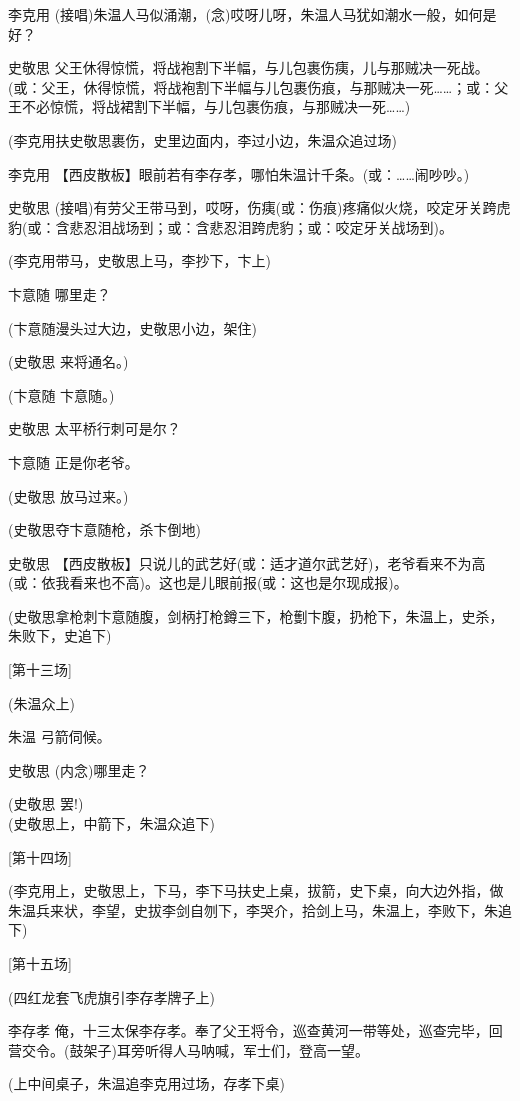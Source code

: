 李克用
(接唱)朱温人马似涌潮，(念)哎呀儿呀，朱温人马犹如潮水一般，如何是好？

史敬思
父王休得惊慌，将战袍割下半幅，与儿包裹伤痍，儿与那贼决一死战。(或：父王，休得惊慌，将战袍割下半幅与儿包裹伤痕，与那贼决一死\ldots{}\ldots{}；或：父王不必惊慌，将战裙割下半幅，与儿包裹伤痕，与那贼决一死\ldots{}\ldots{})

(李克用扶史敬思裹伤，史里边面内，李过小边，朱温众追过场)

李克用
【西皮散板】眼前若有李存孝，哪怕朱温计千条。(或：\ldots{}\ldots{}闹吵吵。)

史敬思
(接唱)有劳父王带马到，哎呀，伤痍(或：伤痕)疼痛似火烧，咬定牙关跨虎豹(或：含悲忍泪战场到；或：含悲忍泪跨虎豹；或：咬定牙关战场到)。

(李克用带马，史敬思上马，李抄下，卞上)

卞意随 哪里走？

(卞意随漫头过大边，史敬思小边，架住)

(史敬思 来将通名。)

(卞意随 卞意随。)

史敬思 太平桥行刺可是尔？

卞意随 正是你老爷。

(史敬思 放马过来。)

(史敬思夺卞意随枪，杀卞倒地)

史敬思
【西皮散板】只说儿的武艺好(或：适才道尔武艺好)，老爷看来不为高(或：依我看来也不高)。这也是儿眼前报(或：这也是尔现成报)。

(史敬思拿枪刺卞意随腹，剑柄打枪鐏三下，枪劐卞腹，扔枪下，朱温上，史杀，朱败下，史追下)

{[}第十三场{]}

(朱温众上)

朱温 弓箭伺候。

史敬思 (内念)哪里走？

(史敬思 罢!)\\
(史敬思上，中箭下，朱温众追下)

{[}第十四场{]}

(李克用上，史敬思上，下马，李下马扶史上桌，拔箭，史下桌，向大边外指，做朱温兵来状，李望，史拔李剑自刎下，李哭介，拾剑上马，朱温上，李败下，朱追下)

{[}第十五场{]}

(四红龙套飞虎旗引李存孝牌子上)

李存孝
俺，十三太保李存孝。奉了父王将令，巡查黄河一带等处，巡查完毕，回营交令。(鼓架子)耳旁听得人马呐喊，军士们，登高一望。

(上中间桌子，朱温追李克用过场，存孝下桌)

